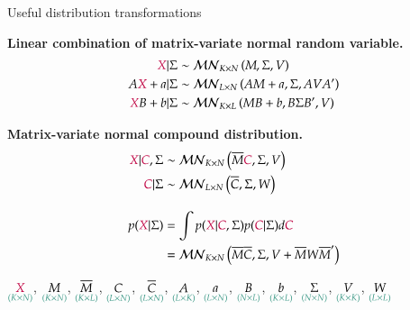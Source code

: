 \documentclass[notes,blackandwhite,mathsans,usenames,dvipsnames]{beamer}
\begin{document}
\begin{frame}{Useful distribution transformations}

\textbf{Linear combination of matrix-variate normal random variable.}
\begin{align*} 
{\color{purple}X}|\Sigma &\sim\mathcal{MN}_{K\times N}\left( M, \Sigma, V \right)\\
A{\color{purple}X}+a|\Sigma &\sim\mathcal{MN}_{L\times N}\left( AM+a, \Sigma, AVA' \right)\\
{\color{purple}X}B+b|\Sigma &\sim\mathcal{MN}_{K\times L}\left( MB+b, B\Sigma B', V \right)
\end{align*} 

\bigskip\textbf{Matrix-variate normal compound distribution.}
\begin{align*} 
{\color{purple}X}|{\color{purple}C},\Sigma &\sim\mathcal{MN}_{K\times N}\left( \overline{M}{\color{purple}C}, \Sigma, V \right)\\
{\color{purple}C}|\Sigma &\sim\mathcal{MN}_{L\times N}\left( \overline{C}, \Sigma, W \right)\\[2ex]
p({\color{purple}X}|\Sigma) &= \int p({\color{purple}X}|{\color{purple}C},\Sigma)p({\color{purple}C}|\Sigma)d{\color{purple}C}\\
&= \mathcal{MN}_{K\times N}\left( \overline{M}\overline{C}, \Sigma, V + \overline{M}W\overline{M}' \right)
\end{align*} 

\bigskip\footnotesize $\underset{\color{mcxs2}(K\times N)}{{\color{purple}X}}$, $\underset{\color{mcxs2}(K\times N)}{M}$, $\underset{\color{mcxs2}(K\times L)}{\overline{M}}$, $\underset{\color{mcxs2}(L\times N)}{C}$, $\underset{\color{mcxs2}(L\times N)}{\overline{C}}$, $\underset{\color{mcxs2}(L\times K)}{A}$, $\underset{\color{mcxs2}(L\times N)}{a}$, $\underset{\color{mcxs2}(N\times L)}{B}$, $\underset{\color{mcxs2}(K\times L)}{b}$, $\underset{\color{mcxs2}(N\times N)}{\Sigma}$, $\underset{\color{mcxs2}(K\times K)}{V}$, $\underset{\color{mcxs2}(L\times L)}{W}$

\end{frame}
\end{document}
